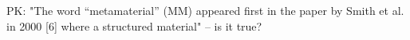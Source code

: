 PK: "The word “metamaterial” (MM) appeared first in the paper by Smith et al. in 2000 [6] where a structured material" -- is it true?







